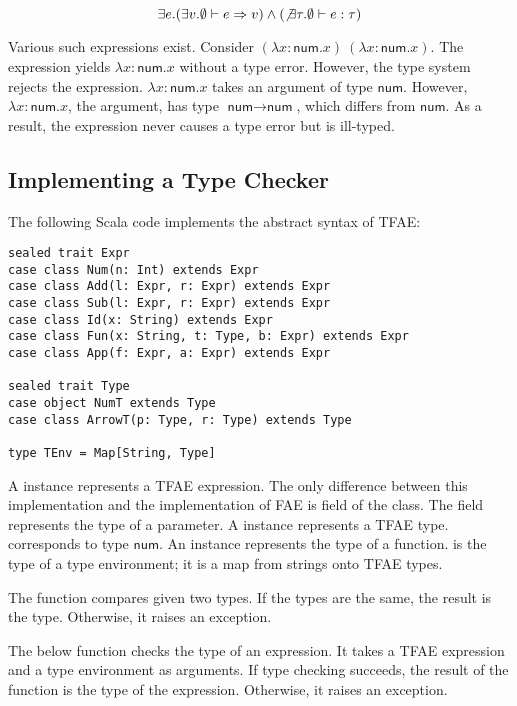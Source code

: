 \[
\exists e.(\exists v.\emptyset\vdash e\Rightarrow
v)\land(\not\exists\tau.\emptyset\vdash e:\tau)
\]

Various such expressions exist. Consider $(\lambda x:\textsf{num}.x)\ (\lambda
x:\textsf{num}.x)$. The expression yields $\lambda x:\textsf{num}.x$ without a
type error. However, the type system rejects the expression. $\lambda
x:\textsf{num}.x$ takes an argument of type $\textsf{num}$. However, $\lambda
x:\textsf{num}.x$, the argument, has type $\textsf{num}\rightarrow\textsf{num}$,
which differs from $\textsf{num}$. As a result, the expression never causes a
type error but is ill-typed.

\subsection{Implementing a Type Checker}

The following Scala code implements the abstract syntax of TFAE:

\begin{verbatim}
sealed trait Expr
case class Num(n: Int) extends Expr
case class Add(l: Expr, r: Expr) extends Expr
case class Sub(l: Expr, r: Expr) extends Expr
case class Id(x: String) extends Expr
case class Fun(x: String, t: Type, b: Expr) extends Expr
case class App(f: Expr, a: Expr) extends Expr

sealed trait Type
case object NumT extends Type
case class ArrowT(p: Type, r: Type) extends Type

type TEnv = Map[String, Type]
\end{verbatim}

A  instance represents a TFAE expression. The only difference between
this implementation and the implementation of FAE is field  of the
 class. The field represents the type of a parameter. A 
instance represents a TFAE type.  corresponds to type $\textsf{num}$.
An  instance represents the type of a function.  is the
type of a type environment; it is a map from strings onto TFAE types.

The  function compares given two types. If the types are the same,
the result is the type. Otherwise, it raises an exception.

The below  function checks the type of an expression. It takes a
TFAE expression and a type environment as arguments. If type checking succeeds,
the result of the function is the type of the expression. Otherwise, it raises an
exception.


